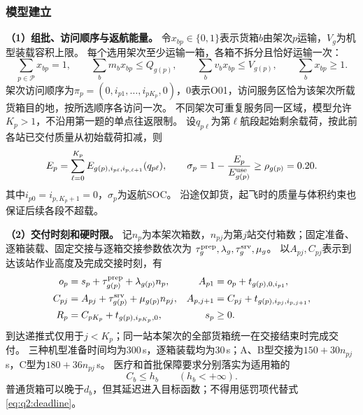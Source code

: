 \subsubsection{模型建立}
\label{sec:q2:formulation}

\textbf{（1）组批、访问顺序与返航能量。}
令$x_{bp}\in\{0,1\}$表示货箱$b$由架次$p$运输，$V_g$为机型装载容积上限。
每个选用架次至少运输一箱，各箱不拆分且恰好运输一次：
\begin{equation}
 \sum_{p\in\mathcal P}x_{bp}=1,\qquad
 \sum_bm_bx_{bp}\le Q_{g(p)},\qquad
 \sum_bv_bx_{bp}\le V_{g(p)},\qquad
 \sum_bx_{bp}\ge1.
 \label{eq:q2:packing}
\end{equation}
架次访问顺序为$\pi_p=(0,i_{p1},\ldots,i_{pK_p},0)$，0表示O01，访问服务区恰为该架次所载货箱目的地，按所选顺序各访问一次。
不同架次可重复服务同一区域，模型允许$K_p>1$，不沿用第一题的单点往返限制。
设$q_{p\ell}$为第$\ell$航段起始剩余载荷，按此前各站已交付质量从初始载荷扣减，则
\begin{equation}
 E_p=\sum_{\ell=0}^{K_p}E_{g(p),i_{p\ell},i_{p,\ell+1}}(q_{p\ell}),\qquad
 \sigma_p=1-\frac{E_p}{E_{g(p)}^{\rm use}}\ge\rho_{g(p)}=0.20.
 \label{eq:q2:reserve}
\end{equation}
其中$i_{p0}=i_{p,K_p+1}=0$，$\sigma_p$为返航SOC。
沿途仅卸货，起飞时的质量与体积约束也保证后续各段不超载。

\textbf{（2）交付时刻和硬时限。}
记$n_p$为本架次箱数，$n_{pj}$为第$j$站交付箱数；固定准备、逐箱装载、固定交接与逐箱交接参数依次为
$\tau_g^{\rm prep},\lambda_g,\tau_g^{\rm srv},\mu_g$。
以$A_{pj},C_{pj}$表示到达该站作业高度及完成交接时刻，有
\begin{align}
 o_p&=s_p+\tau_{g(p)}^{\rm prep}+\lambda_{g(p)}n_p,
 & A_{p1}&=o_p+t_{g(p),0,i_{p1}},\notag\\
 C_{pj}&=A_{pj}+\tau_{g(p)}^{\rm srv}+\mu_{g(p)}n_{pj},
 & A_{p,j+1}&=C_{pj}+t_{g(p),i_{pj},i_{p,j+1}},\notag\\
 R_p&=C_{pK_p}+t_{g(p),i_{pK_p},0},
 & s_p&\ge0.
 \label{eq:q2:timing}
\end{align}
到达递推式仅用于$j<K_p$；同一站本架次的全部货箱统一在交接结束时完成交付。
三种机型准备时间均为300\,s，逐箱装载均为30\,s；A、B型交接为$150+30n_{pj}$\,s，C型为$180+36n_{pj}$\,s。
医疗和首批保障要求分别落实为适用箱的
\begin{equation}
 C_b\le h_b\qquad(h_b<+\infty).
 \label{eq:q2:deadline}
\end{equation}
普通货箱可以晚于$d_b$，但其延迟进入目标函数；不得用惩罚项代替式\eqref{eq:q2:deadline}。

